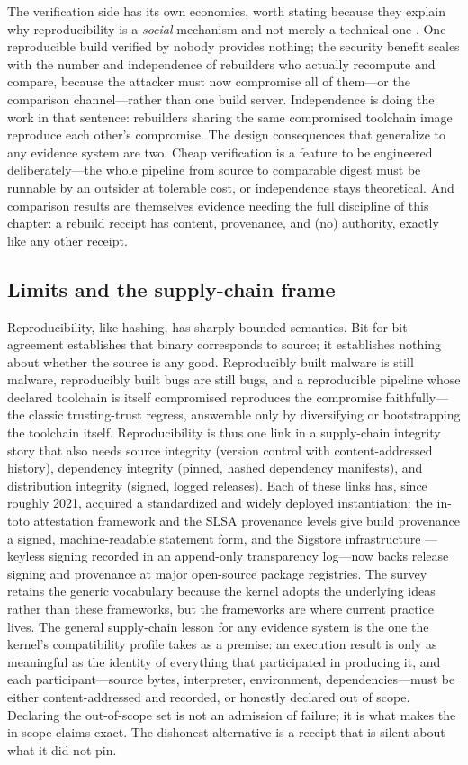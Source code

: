 The verification side has its own economics, worth stating because
they explain why reproducibility is a \emph{social} mechanism and
not merely a technical one \cite{reprobuilds}. One reproducible
build verified by nobody provides nothing; the security benefit
scales with the number and independence of rebuilders who actually
recompute and compare, because the attacker must now compromise all
of them---or the comparison channel---rather than one build server.
Independence is doing the work in that sentence: rebuilders sharing
the same compromised toolchain image reproduce each other's
compromise. The design consequences that generalize to any evidence
system are two. Cheap verification is a feature to be engineered
deliberately---the whole pipeline from source to comparable digest
must be runnable by an outsider at tolerable cost, or independence
stays theoretical. And comparison results are themselves evidence
needing the full discipline of this chapter: a rebuild receipt has
content, provenance, and (no) authority, exactly like any other
receipt.

\subsection{Limits and the supply-chain frame}\label{ch02:repro-limits}

Reproducibility, like hashing, has sharply bounded semantics.
Bit-for-bit agreement establishes that binary corresponds to source;
it establishes nothing about whether the source is any good.
Reproducibly built malware is still malware, reproducibly built bugs
are still bugs, and a reproducible pipeline whose declared toolchain
is itself compromised reproduces the compromise faithfully---the
classic trusting-trust regress, answerable only by diversifying or
bootstrapping the toolchain itself. Reproducibility is thus one link
in a supply-chain integrity story that also needs source integrity
(version control with content-addressed history), dependency
integrity (pinned, hashed dependency manifests), and distribution
integrity (signed, logged releases). Each of these links has, since
roughly 2021, acquired a standardized and widely deployed
instantiation: the in-toto attestation framework and the SLSA
provenance levels \cite{intoto,slsa} give build provenance a signed,
machine-readable statement form, and the Sigstore
infrastructure \cite{sigstore}---keyless signing recorded in an
append-only transparency log---now backs release signing and
provenance at major open-source package registries. The survey
retains the generic vocabulary because the kernel adopts the
underlying ideas rather than these frameworks, but the frameworks
are where current practice lives. The general supply-chain lesson
for any evidence system is the one the kernel's compatibility
profile takes as a premise: an execution result is only as
meaningful as the identity of everything that participated in
producing it, and each participant---source bytes, interpreter,
environment, dependencies---must be either content-addressed and
recorded, or honestly declared out of scope. Declaring the
out-of-scope set is not an admission of failure; it is what makes
the in-scope claims exact. The dishonest alternative is a receipt
that is silent about what it did not pin.


